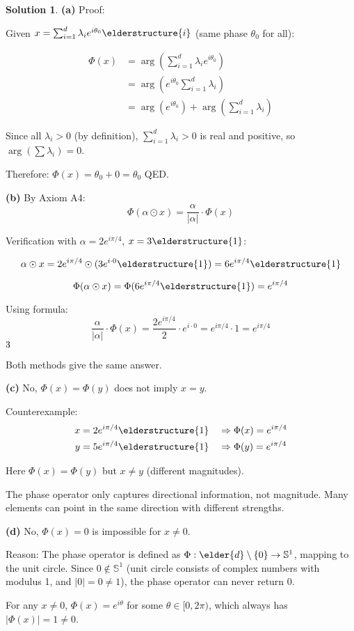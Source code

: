 \documentclass[12pt,a4paper]{book}
\newcommand{\checkmark}{\ding{51}}
\theoremstyle{definition}
\newtheorem{solution}{Solution}[section]
\theoremstyle{remark}
\begin{document}
\begin{solution}
\textbf{(a)} Proof:

Given $x = \sum_{i=1}^{d} \lambda_i e^{i\theta_0} \elderstructure{i}$ (same phase $\theta_0$ for all):

\begin{align}
\Phi(x) &= \arg\left(\sum_{i=1}^{d} \lambda_i e^{i\theta_0}\right) \\
&= \arg\left(e^{i\theta_0} \sum_{i=1}^{d} \lambda_i\right) \\
&= \arg(e^{i\theta_0}) + \arg\left(\sum_{i=1}^{d} \lambda_i\right)
\end{align}

Since all $\lambda_i > 0$ (by definition), $\sum_{i=1}^{d} \lambda_i > 0$ is real and positive, so $\arg(\sum \lambda_i) = 0$.

Therefore: $\Phi(x) = \theta_0 + 0 = \theta_0$ QED.

\textbf{(b)} By Axiom A4:
$$\Phi(\alpha \odot x) = \frac{\alpha}{|\alpha|} \cdot \Phi(x)$$

Verification with $\alpha = 2e^{i\pi/4}$, $x = 3\elderstructure{1}$:

$$\alpha \odot x = 2e^{i\pi/4} \odot (3e^{i \cdot 0}\elderstructure{1}) = 6e^{i\pi/4}\elderstructure{1}$$

$$\Phi(\alpha \odot x) = \Phi(6e^{i\pi/4}\elderstructure{1}) = e^{i\pi/4}$$

Using formula:
$$\frac{\alpha}{|\alpha|} \cdot \Phi(x) = \frac{2e^{i\pi/4}}{2} \cdot e^{i \cdot 0} = e^{i\pi/4} \cdot 1 = e^{i\pi/4}$$ $\checkmark$

Both methods give the same answer.

\textbf{(c)} No, $\Phi(x) = \Phi(y)$ does not imply $x = y$.

Counterexample:
\begin{align}
x &= 2e^{i\pi/4}\elderstructure{1} \quad \Rightarrow \Phi(x) = e^{i\pi/4} \\
y &= 5e^{i\pi/4}\elderstructure{1} \quad \Rightarrow \Phi(y) = e^{i\pi/4}
\end{align}

Here $\Phi(x) = \Phi(y)$ but $x \neq y$ (different magnitudes).

The phase operator only captures directional information, not magnitude. Many elements can point in the same direction with different strengths.

\textbf{(d)} No, $\Phi(x) = 0$ is impossible for $x \neq 0$.

Reason: The phase operator is defined as $\Phi: \elder{d} \setminus \{0\} \rightarrow \mathbb{S}^1$, mapping to the unit circle. Since $0 \notin \mathbb{S}^1$ (unit circle consists of complex numbers with modulus 1, and $|0| = 0 \neq 1$), the phase operator can never return 0.

For any $x \neq 0$, $\Phi(x) = e^{i\theta}$ for some $\theta \in [0, 2\pi)$, which always has $|\Phi(x)| = 1 \neq 0$.
\end{solution}
\end{document}

